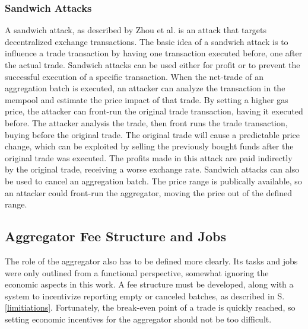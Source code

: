\documentclass[../../thesis.tex]{subfiles}
\begin{document}
\subsubsection{Sandwich Attacks} 
A sandwich attack, as described by Zhou et al. \cite{zhou2020high} is an attack that targets decentralized exchange transactions. The basic idea of a sandwich attack is to influence a trade transaction by having one transaction executed before, one after the actual trade. Sandwich attacks can be used either for profit or to prevent the successful execution of a specific transaction. When the net-trade of an aggregation batch is executed, an attacker can analyze the transaction in the mempool and estimate the price impact of that trade. By setting a higher gas price, the attacker can front-run \cite{adams2020uniswap} the original trade transaction, having it executed before. The attacker analysis the trade, then front runs the trade transaction, buying before the original trade. The original trade will cause a predictable price change, which can be exploited by selling the previously bought funds after the original trade was executed. The profits made in this attack are paid indirectly by the original trade, receiving a worse exchange rate. Sandwich attacks can also be used to cancel an aggregation batch. The price range is publically available, so an attacker could front-run the aggregator, moving the price out of the defined range. 

\subsection{Aggregator Fee Structure and Jobs}
The role of the aggregator also has to be defined more clearly. Its tasks and jobs were only outlined from a functional perspective, somewhat ignoring the economic aspects in this work. A fee structure must be developed, along with a system to incentivize reporting empty or canceled batches, as described in S. \ref{limitiations}. Fortunately, the break-even point of a trade is quickly reached, so setting economic incentives for the aggregator should not be too difficult.
\end{document}

